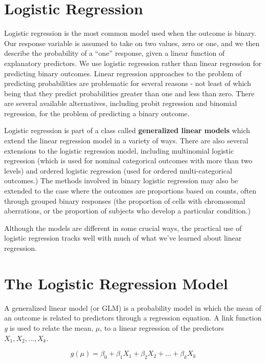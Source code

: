 \documentclass[]{book}
\theoremstyle{definition}
\theoremstyle{definition}
\theoremstyle{definition}
\theoremstyle{remark}
\begin{document}
\section{Logistic Regression}\label{logistic-regression}

Logistic regression is the most common model used when the outcome is
binary. Our response variable is assumed to take on two values, zero or
one, and we then describe the probability of a ``one'' response, given a
linear function of explanatory predictors. We use logistic regression
rather than linear regression for predicting binary outcomes. Linear
regression approaches to the problem of predicting probabilities are
problematic for several reasons - not least of which being that they
predict probabilities greater than one and less than zero. There are
several available alternatives, including probit regression and binomial
regression, for the problem of predicting a binary outcome.

Logistic regression is part of a class called \textbf{generalized linear
models} which extend the linear regression model in a variety of ways.
There are also several extensions to the logistic regression model,
including multinomial logistic regression (which is used for nominal
categorical outcomes with more than two levels) and ordered logistic
regression (used for ordered multi-categorical outcomes.) The methods
involved in binary logistic regression may also be extended to the case
where the outcomes are proportions based on counts, often through
grouped binary responses (the proportion of cells with chromosomal
aberrations, or the proportion of subjects who develop a particular
condition.)

Although the models are different in some crucial ways, the practical
use of logistic regression tracks well with much of what we've learned
about linear regression.

\section{The Logistic Regression
Model}\label{the-logistic-regression-model}

A generalized linear model (or GLM) is a probability model in which the
mean of an outcome is related to predictors through a regression
equation. A link function \emph{g} is used to relate the mean, \(\mu\),
to a linear regression of the predictors \(X_1, X_2, ..., X_k\).

\[
g(\mu) = \beta_0 + \beta_1 X_1 + \beta_2 X_2 + ... + \beta_k X_k
\]
\end{document}
